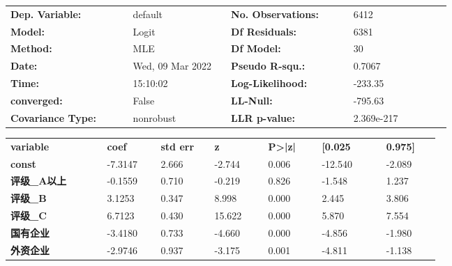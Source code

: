 \begin{center}
	\begin{tabular}{p{0.25\linewidth}p{0.2\linewidth}p{0.25\linewidth}p{0.2\linewidth}}

		\toprule
		\textbf{Dep. Variable:}   & default          & \textbf{  No. Observations:  } & 6412       \\
		\textbf{Model:}           & Logit            & \textbf{  Df Residuals:      } & 6381       \\
		\textbf{Method:}          & MLE              & \textbf{  Df Model:          } & 30         \\
		\textbf{Date:}            & Wed, 09 Mar 2022 & \textbf{  Pseudo R-squ.:     } & 0.7067     \\
		\textbf{Time:}            & 15:10:02         & \textbf{  Log-Likelihood:    } & -233.35    \\
		\textbf{converged:}       & False            & \textbf{  LL-Null:           } & -795.63    \\
		\textbf{Covariance Type:} & nonrobust        & \textbf{  LLR p-value:       } & 2.369e-217 \\
		\bottomrule
	\end{tabular}
	\begin{longtable}{p{0.18\linewidth}p{0.1\linewidth}p{0.1\linewidth}p{0.1\linewidth}p{0.1\linewidth}p{0.12\linewidth}p{0.1\linewidth}}
		\midrule
		\textbf{variable}           & \textbf{coef} & \textbf{std err} & \textbf{z} & \textbf{P>|z|} & \textbf{[0.025} & \textbf{0.975]} \\
		\textbf{const}              & -7.3147       & 2.666            & -2.744     & 0.006          & -12.540         & -2.089          \\
		\textbf{评级\_A以上}        & -0.1559       & 0.710            & -0.219     & 0.826          & -1.548          & 1.237           \\
		\textbf{评级\_B}            & 3.1253        & 0.347            & 8.998      & 0.000          & 2.445           & 3.806           \\
		\textbf{评级\_C}            & 6.7123        & 0.430            & 15.622     & 0.000          & 5.870           & 7.554           \\
		\textbf{国有企业}           & -3.4180       & 0.733            & -4.660     & 0.000          & -4.856          & -1.980          \\
		\textbf{外资企业}           & -2.9746       & 0.937            & -3.175     & 0.001          & -4.811          & -1.138          \\

\end{longtable}
\end{center}
